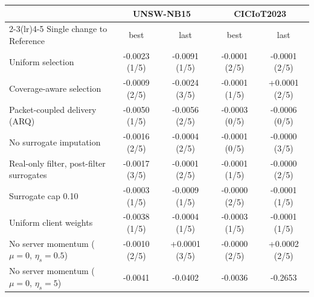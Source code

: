 \begin{tabular}{@{}lcccc@{}}\toprule
 & \multicolumn{2}{c}{UNSW-NB15} & \multicolumn{2}{c}{CICIoT2023}\\\cmidrule(lr){2-3}\cmidrule(lr){4-5}
Single change to Reference & best & last & best & last\\\midrule
Uniform selection & -0.0023 (1/5) & -0.0091 (1/5) & -0.0001 (2/5) & -0.0001 (2/5) \\
Coverage-aware selection & -0.0009 (2/5) & -0.0024 (3/5) & -0.0001 (1/5) & +0.0001 (2/5) \\
Packet-coupled delivery (ARQ) & -0.0050 (1/5) & -0.0056 (2/5) & -0.0003 (0/5) & -0.0006 (0/5) \\
No surrogate imputation & -0.0016 (2/5) & -0.0004 (2/5) & -0.0001 (0/5) & -0.0000 (3/5) \\
Real-only filter, post-filter surrogates & -0.0017 (3/5) & -0.0001 (2/5) & -0.0001 (1/5) & -0.0000 (2/5) \\
Surrogate cap 0.10 & -0.0003 (1/5) & -0.0009 (1/5) & -0.0000 (2/5) & -0.0001 (1/5) \\
Uniform client weights & -0.0038 (1/5) & -0.0004 (1/5) & -0.0003 (1/5) & -0.0001 (1/5) \\
No server momentum ($\mu{=}0$, $\eta_s{=}0.5$) & -0.0010 (2/5) & +0.0001 (3/5) & -0.0000 (2/5) & +0.0002 (2/5) \\
No server momentum ($\mu{=}0$, $\eta_s{=}5$) & -0.0041 & -0.0402 & -0.0036 & -0.2653 \\
\bottomrule\end{tabular}
